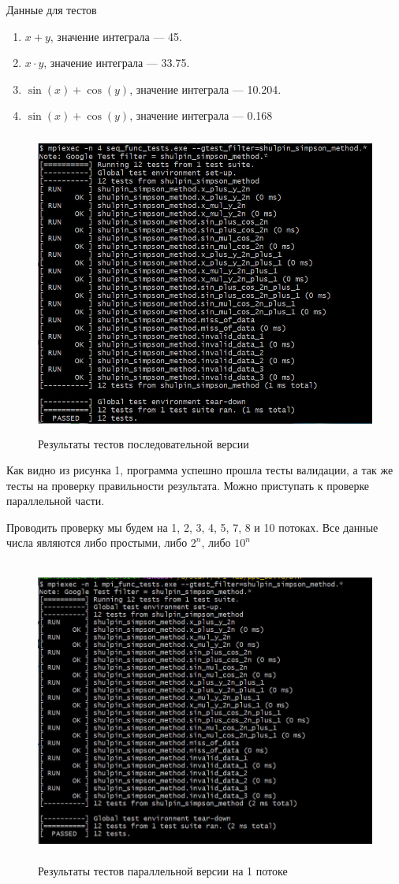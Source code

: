 \documentclass[12pt,a4paper]{article}
\begin{document}
Данные для тестов
\begin{enumerate}
    \item $x + y$, значение интеграла --- 45.
    \item $x \cdot y$, значение интеграла --- 33.75.
    \item $\sin(x) + \cos(y)$, значение интеграла --- 10.204.
    \item $\sin(x) + \cos(y)$, значение интеграла --- 0.168
\end{enumerate}

\begin{figure}[H]
\centering
\includegraphics[height=10cm]{img/seqfunctests.jpg}
\caption{\label{fig:visualClass} Результаты тестов последовательной версии}
\end{figure}

Как видно из рисунка 1, программа успешно прошла тесты валидации, а так же тесты на проверку правильности результата. Можно приступать к проверке параллельной части.

Проводить проверку мы будем на 1, 2, 3, 4, 5, 7, 8 и 10 потоках. Все данные числа являются либо простыми, либо \(2^{n}\), либо \(10^{n}\)

\begin{figure}[H]
\centering
\includegraphics[height=10cm]{img/1nmpitest.jpg}
\caption{\label{fig:visualClass} Результаты тестов параллельной версии на 1 потоке}
\end{figure}
\end{document}
